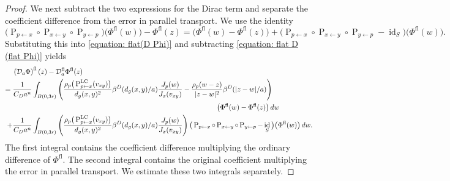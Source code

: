 \documentclass[a4paper,oneside,12pt]{amsart}
\theoremstyle{plain}
\theoremstyle{definition}
\theoremstyle{remark}
\DeclarePairedDelimiter{\abs}{\lvert}{\rvert}
\DeclareMathOperator{\id}{id}
\newcommand{\paralleltransport}[2]{\operatorname{P}_{#2 \gets #1}}
\newcommand{\paralleltransportLC}[2]{\paralleltransport{#1}{#2}^{\mathrm{LC}}}
\newcommand{\cliffordmultiplication}{\rho}
\newcommand{\mesoscopicDiracoperator}[1][a]{\mathcal{D}_{#1}}
\newcommand{\cutoff}{\beta}
\newcommand{\cutoffDirac}{\cutoff^D}
\newcommand{\flatmesoscopicDiracoperator}{\mesoscopicDiracoperator^{\mathrm{fl}}}
\newcommand{\flatmodel}[1]{#1^{\mathrm{fl}}}
\begin{document}
\begin{proof}
  We next subtract the two expressions for the Dirac term and separate the coefficient difference from the error in parallel transport.
  We use the identity
  \begin{equation}
    \big(\paralleltransport{x}{p} \circ \paralleltransport{y}{x} \circ \paralleltransport{p}{y}\big)\big(\flatmodel{\Phi}(w)\big) - \flatmodel{\Phi}(z) = \big(\flatmodel{\Phi}(w)-\flatmodel{\Phi}(z)\big) + \big(\paralleltransport{x}{p} \circ \paralleltransport{y}{x} \circ \paralleltransport{p}{y}-\id_S\big)\big(\flatmodel{\Phi}(w)\big).
  \end{equation}
  Substituting this into \eqref{equation: flat(D Phi)} and subtracting \eqref{equation: flat D (flat Phi)} yields
  \begin{equation}\label{equation: flat(D Phi) minus flat D (flat Phi)}
    \begin{aligned}
    & \flatmodel{\left(\mesoscopicDiracoperator \Phi\right)}(z) - \flatmesoscopicDiracoperator \flatmodel{\Phi}(z) \\
    ={}& \begin{multlined}[t]
      \frac{1}{C_D a^n} \int_{B(0,3r)} \left( \frac{\cliffordmultiplication_p \big(\paralleltransportLC{x}{p}(v_{xy})\big) }{d_g(x,y)^2} \cutoffDirac(d_g(x,y)/a) \frac{J_p(w)}{J_x(v_{xy})} - \frac{\cliffordmultiplication_p(w-z)}{\abs{z-w}^2} \cutoffDirac(\abs{z-w}/a) \right) \\ \big(\flatmodel{\Phi}(w) - \flatmodel{\Phi}(z)\big) \,dw
    \end{multlined} \\
    +{}& \frac{1}{C_D a^n} \int_{B(0,3r)} \left( \frac{\cliffordmultiplication_p \big(\paralleltransportLC{x}{p}(v_{xy})\big) }{d_g(x,y)^2} \cutoffDirac(d_g(x,y)/a) \frac{J_p(w)}{J_x(v_{xy})} \right) \big(\paralleltransport{x}{p} \circ \paralleltransport{y}{x} \circ \paralleltransport{p}{y} - \id_S\big) \big(\flatmodel{\Phi}(w)\big) \,dw.
    \end{aligned}
  \end{equation}
  The first integral contains the coefficient difference multiplying the ordinary difference of $\flatmodel{\Phi}$.
  The second integral contains the original coefficient multiplying the error in parallel transport.
  We estimate these two integrals separately.


\end{proof}
\end{document}
